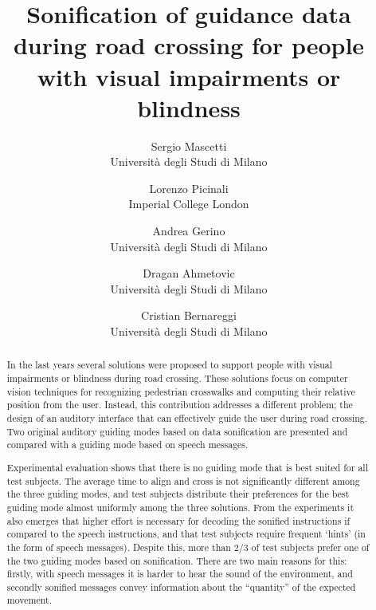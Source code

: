 \documentclass{article}
\title{Sonification of guidance data during road crossing for people with visual impairments or blindness}
\author{Sergio Mascetti\\
\small{Universit\`{a} degli Studi di Milano}\\
\and
Lorenzo Picinali\\
\small{Imperial College London}\\
\and
Andrea Gerino\\
\small{Universit\`{a} degli Studi di Milano}\\
\and
Dragan Ahmetovic\\
\small{Universit\`{a} degli Studi di Milano}\\
\and
Cristian Bernareggi\\
\small{Universit\`{a} degli Studi di Milano}\\
}
\begin{document}
\maketitle







\begin{abstract}
In the last years several solutions were proposed to support people with visual impairments or blindness during road crossing. These solutions focus on computer vision techniques for recognizing pedestrian crosswalks and computing their relative position from the user.
Instead, this contribution addresses a different problem; the design of an auditory interface that can effectively guide the user during road crossing. Two original auditory guiding modes based on data sonification are presented and compared with a guiding mode based on speech messages.

Experimental evaluation shows that there is no guiding mode that is best suited for all test subjects. The average time to align and cross is not significantly different among the three guiding modes, and test subjects distribute their preferences for the best guiding mode almost uniformly among the three solutions.
From the experiments it also emerges that higher effort is necessary for decoding the sonified instructions if compared to the speech instructions, and that test subjects require frequent `hints' (in the form of speech messages).
Despite this, more than $2/3$ of test subjects prefer one of the two guiding modes based on sonification. There are two main reasons for this: firstly, with speech messages it is harder to hear the sound of the environment, and secondly sonified messages convey information about the ``quantity'' of the expected movement.
\end{abstract}
\end{document}
